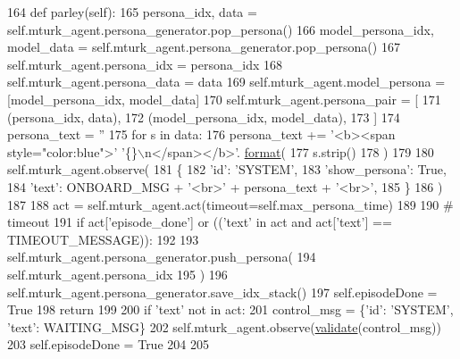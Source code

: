 \begin{DoxyCode}
164     \textcolor{keyword}{def }parley(self):
165         persona\_idx, data = self.mturk\_agent.persona\_generator.pop\_persona()
166         model\_persona\_idx, model\_data = self.mturk\_agent.persona\_generator.pop\_persona()
167         self.mturk\_agent.persona\_idx = persona\_idx
168         self.mturk\_agent.persona\_data = data
169         self.mturk\_agent.model\_persona = [model\_persona\_idx, model\_data]
170         self.mturk\_agent.persona\_pair = [
171             (persona\_idx, data),
172             (model\_persona\_idx, model\_data),
173         ]
174         persona\_text = \textcolor{stringliteral}{''}
175         \textcolor{keywordflow}{for} s \textcolor{keywordflow}{in} data:
176             persona\_text += \textcolor{stringliteral}{'<b><span style="color:blue">'} \textcolor{stringliteral}{'\{\}\(\backslash\)n</span></b>'}.
      \hyperlink{namespaceparlai_1_1chat__service_1_1services_1_1messenger_1_1shared__utils_a32e2e2022b824fbaf80c747160b52a76}{format}(
177                 s.strip()
178             )
179 
180         self.mturk\_agent.observe(
181             \{
182                 \textcolor{stringliteral}{'id'}: \textcolor{stringliteral}{'SYSTEM'},
183                 \textcolor{stringliteral}{'show\_persona'}: \textcolor{keyword}{True},
184                 \textcolor{stringliteral}{'text'}: ONBOARD\_MSG + \textcolor{stringliteral}{'<br>'} + persona\_text + \textcolor{stringliteral}{'<br>'},
185             \}
186         )
187 
188         act = self.mturk\_agent.act(timeout=self.max\_persona\_time)
189 
190         \textcolor{comment}{# timeout}
191         \textcolor{keywordflow}{if} act[\textcolor{stringliteral}{'episode\_done'}] \textcolor{keywordflow}{or} ((\textcolor{stringliteral}{'text'} \textcolor{keywordflow}{in} act \textcolor{keywordflow}{and} act[\textcolor{stringliteral}{'text'}] == TIMEOUT\_MESSAGE)):
192 
193             self.mturk\_agent.persona\_generator.push\_persona(
194                 self.mturk\_agent.persona\_idx
195             )
196             self.mturk\_agent.persona\_generator.save\_idx\_stack()
197             self.episodeDone = \textcolor{keyword}{True}
198             \textcolor{keywordflow}{return}
199 
200         \textcolor{keywordflow}{if} \textcolor{stringliteral}{'text'} \textcolor{keywordflow}{not} \textcolor{keywordflow}{in} act:
201             control\_msg = \{\textcolor{stringliteral}{'id'}: \textcolor{stringliteral}{'SYSTEM'}, \textcolor{stringliteral}{'text'}: WAITING\_MSG\}
202             self.mturk\_agent.observe(\hyperlink{namespaceparlai_1_1core_1_1worlds_afc3fad603b7bce41dbdc9cdc04a9c794}{validate}(control\_msg))
203             self.episodeDone = \textcolor{keyword}{True}
204 
205 
\end{DoxyCode}


